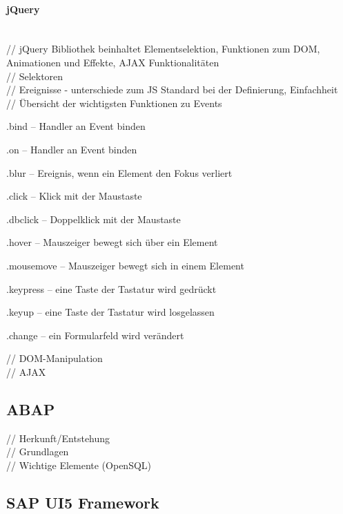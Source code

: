 \documentclass[12pt,a4paper,bibliography=totocnumbered,listof=totocnumbered]{scrartcl}
\begin{document}
\paragraph{jQuery}
$\;$ \\
// jQuery Bibliothek beinhaltet Elementselektion, Funktionen zum DOM, Animationen und Effekte, AJAX Funktionalitäten\\

// Selektoren\\

// Ereignisse - unterschiede zum JS Standard bei der Definierung, Einfachheit\\

// Übersicht der wichtigsten Funktionen zu Events
    \begin{compactitem}
	    \item .bind – Handler an Event binden
	    \item .on – Handler an Event binden
	    \item .blur – Ereignis, wenn ein Element den Fokus verliert
	    \item .click – Klick mit der Maustaste
	    \item .dbclick – Doppelklick mit der Maustaste
	    \item .hover – Mauszeiger bewegt sich über ein Element
	    \item .mousemove – Mauszeiger bewegt sich in einem Element
	    \item .keypress – eine Taste der Tastatur wird gedrückt
	    \item .keyup – eine Taste der Tastatur wird losgelassen
	    \item .change – ein Formularfeld wird verändert
    \end{compactitem}
    
// DOM-Manipulation\\

// AJAX\\

\subsection{ABAP}
// Herkunft/Entstehung\\
// Grundlagen\\
// Wichtige Elemente (OpenSQL)\\

\subsection{SAP UI5 Framework}
\end{document}
